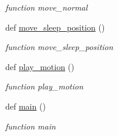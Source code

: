 \begin{DoxyCompactItemize}
\begin{DoxyCompactList}\small\item\em function move\+\_\+normal \end{DoxyCompactList}\item 
def \hyperlink{namespacemotion_a7e28371ac015cdd23c39095626abce98}{move\+\_\+sleep\+\_\+position} ()
\begin{DoxyCompactList}\small\item\em function move\+\_\+sleep\+\_\+position \end{DoxyCompactList}\item 
def \hyperlink{namespacemotion_a8291fff74d22580af44a2c7cb56eaeeb}{play\+\_\+motion} ()
\begin{DoxyCompactList}\small\item\em function play\+\_\+motion \end{DoxyCompactList}\item 
def \hyperlink{namespacemotion_ad6289fca8572f5af95fd28f4c2dbc68d}{main} ()
\begin{DoxyCompactList}\small\item\em function main \end{DoxyCompactList}\end{DoxyCompactItemize}
